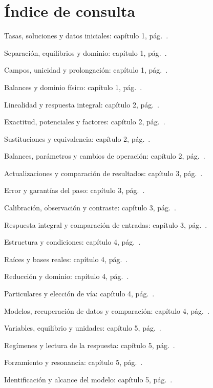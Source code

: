 \chapter{Índice de consulta}
Tasas, soluciones y datos iniciales: capítulo 1, pág.\ \pageref{CH01-B01}.\par
Separación, equilibrios y dominio: capítulo 1, pág.\ \pageref{CH01-B02}.\par
Campos, unicidad y prolongación: capítulo 1, pág.\ \pageref{CH01-B03}.\par
Balances y dominio físico: capítulo 1, pág.\ \pageref{CH01-B04}.\par
Linealidad y respuesta integral: capítulo 2, pág.\ \pageref{CH02-B01}.\par
Exactitud, potenciales y factores: capítulo 2, pág.\ \pageref{CH02-B02}.\par
Sustituciones y equivalencia: capítulo 2, pág.\ \pageref{CH02-B03}.\par
Balances, parámetros y cambios de operación: capítulo 2, pág.\ \pageref{CH02-B04}.\par
Actualizaciones y comparación de resultados: capítulo 3, pág.\ \pageref{CH03-B01}.\par
Error y garantías del paso: capítulo 3, pág.\ \pageref{CH03-B02}.\par
Calibración, observación y contraste: capítulo 3, pág.\ \pageref{CH03-B03}.\par
Respuesta integral y comparación de entradas: capítulo 3, pág.\ \pageref{CH03-B04}.\par
Estructura y condiciones: capítulo 4, pág.\ \pageref{CH04-B01}.\par
Raíces y bases reales: capítulo 4, pág.\ \pageref{CH04-B02}.\par
Reducción y dominio: capítulo 4, pág.\ \pageref{CH04-B03}.\par
Particulares y elección de vía: capítulo 4, pág.\ \pageref{CH04-B04}.\par
Modelos, recuperación de datos y comparación: capítulo 4, pág.\ \pageref{CH04-B05}.\par
Variables, equilibrio y unidades: capítulo 5, pág.\ \pageref{CH05-B01}.\par
Regímenes y lectura de la respuesta: capítulo 5, pág.\ \pageref{CH05-B02}.\par
Forzamiento y resonancia: capítulo 5, pág.\ \pageref{CH05-B03}.\par
Identificación y alcance del modelo: capítulo 5, pág.\ \pageref{CH05-B04}.\par

